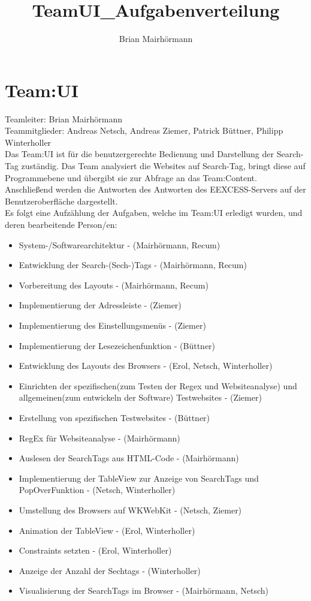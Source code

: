 \documentclass[a4paper,12pt]{article}
\title{TeamUI_Aufgabenverteilung}
\author{Brian Mairhörmann}
\begin{document}
\section{Team:UI}

Teamleiter: Brian Mairhörmann\\
Teammitglieder: Andreas Netsch, Andreas Ziemer, Patrick Büttner, Philipp Winterholler\\
Das Team:UI ist für die benutzergerechte Bedienung und Darstellung der Search-Tag zuständig.
Das Team analysiert die Websites auf Search-Tag, bringt diese auf Programmebene und übergibt sie
zur Abfrage an das Team:Content. Anschließend werden die Antworten des Antworten des EEXCESS-Servers
auf der Benutzeroberfläche dargestellt.\\
Es folgt eine Aufzählung der Aufgaben, welche im Team:UI erledigt wurden, und deren bearbeitende Person/en:\\
\begin{itemize}
	\item System-/Softwarearchitektur - (Mairhörmann, Recum)
	\item Entwicklung der Search-(Sech-)Tags - (Mairhörmann, Recum)
	\item Vorbereitung des Layouts - (Mairhörmann, Recum)
	\item Implementierung der Adressleiste - (Ziemer)
	\item Implementierung des Einstellungsmenüs - (Ziemer)
	\item Implementierung der Lesezeichenfunktion - (Büttner)
	\item Entwicklung des Layouts des Browsers - (Erol, Netsch, Winterholler)
	\item Einrichten der spezifischen(zum Testen der Regex und Websiteanalyse) und allgemeinen(zum entwickeln der Software) Testwebsites - (Ziemer)
	\item Erstellung von spezifischen Testwebsites - (Büttner)
	\item RegEx für Websiteanalyse - (Mairhörmann)
	\item Auslesen der SearchTags aus HTML-Code - (Mairhörmann)
	\item Implementierung der TableView zur Anzeige von SearchTags und PopOverFunktion - (Netsch, Winterholler)
	\item Umstellung des Browsers auf WKWebKit - (Netsch, Ziemer)
	\item Animation der TableView - (Erol, Winterholler)
	\item Constraints setzten - (Erol, Winterholler)
	\item Anzeige der Anzahl der Sechtags - (Winterholler)
	\item Visualisierung der SearchTags im Browser - (Mairhörmann, Netsch)
\end{itemize}
\end{document}
